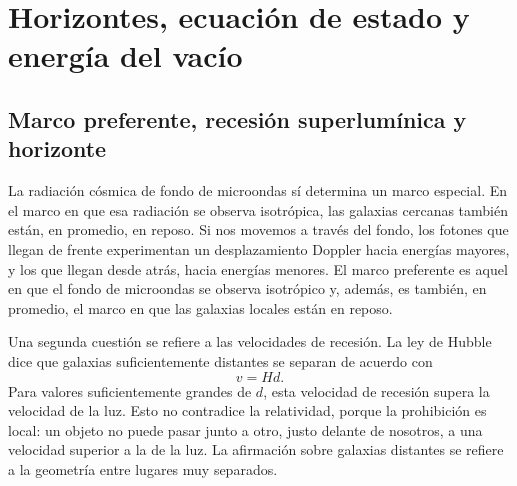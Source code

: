 \chapter{Horizontes, ecuación de estado y energía del vacío}

\section{Marco preferente, recesión superlumínica y horizonte}

La radiación cósmica de fondo de microondas sí determina un marco especial. En el marco en que esa radiación se observa isotrópica, las galaxias cercanas también están, en promedio, en reposo. Si nos movemos a través del fondo, los fotones que llegan de frente experimentan un desplazamiento Doppler hacia energías mayores, y los que llegan desde atrás, hacia energías menores. El marco preferente es aquel en que el fondo de microondas se observa isotrópico y, además, es también, en promedio, el marco en que las galaxias locales están en reposo.

\begin{classroomqa}
\end{classroomqa}

Una segunda cuestión se refiere a las velocidades de recesión. La ley de Hubble dice que galaxias suficientemente distantes se separan de acuerdo con
\begin{equation}
v = H d .
\end{equation}
Para valores suficientemente grandes de \(d\), esta velocidad de recesión supera la velocidad de la luz. Esto no contradice la relatividad, porque la prohibición es local: un objeto no puede pasar junto a otro, justo delante de nosotros, a una velocidad superior a la de la luz. La afirmación sobre galaxias distantes se refiere a la geometría entre lugares muy separados.

\begin{classroomqa}
\end{classroomqa}

